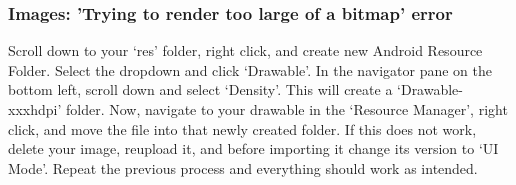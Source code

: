 \documentclass[letterpaper,12pt]{report}
\begin{document}
\subsubsection*{Images: 'Trying to render too large of a bitmap' error}

Scroll down to your ‘res’ folder, right click, and create new Android Resource Folder. Select the dropdown and click ‘Drawable’. In the navigator pane on the bottom left, scroll down and select ‘Density’. This will create a ‘Drawable-xxxhdpi’ folder. Now, navigate to your drawable in the ‘Resource Manager’, right click, and move the file into that newly created folder. If this does not work, delete your image, reupload it, and before importing it change its version to ‘UI Mode’. Repeat the previous process and everything should work as intended.



\end{document}
